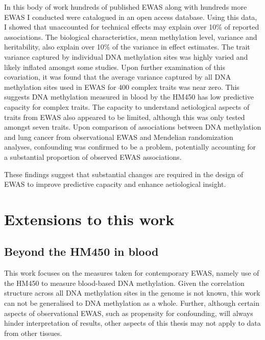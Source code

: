 \documentclass[11pt,oneside]{bristolthesis}
\begin{document}
In this body of work hundreds of published EWAS along with hundreds more EWAS I conducted were catalogued in an open access database. Using this data, I showed that unaccounted for technical effects may explain over 10\% of reported associations. The biological characteristics, mean methylation level, variance and heritability, also explain over 10\% of the variance in effect estimates. The trait variance captured by individual DNA methylation sites was highly varied and likely inflated amongst some studies. Upon further examination of this covariation, it was found that the average variance captured by all DNA methylation sites used in EWAS for 400 complex traits was near zero. This suggests DNA methylation measured in blood by the HM450 has low predictive capacity for complex traits. The capacity to understand aetiological aspects of traits from EWAS also appeared to be limited, although this was only tested amongst seven traits. Upon comparison of associations between DNA methylation and lung cancer from observational EWAS and Mendelian randomization analyses, confounding was confirmed to be a problem, potentially accounting for a substantial proportion of observed EWAS associations.

These findings suggest that substantial changes are required in the design of EWAS to improve predictive capacity and enhance aetiological insight.

\hypertarget{extensions-to-work}{%
\section{Extensions to this work}\label{extensions-to-work}}

\hypertarget{beyond-the-hm450}{%
\subsection{Beyond the HM450 in blood}\label{beyond-the-hm450}}

This work focuses on the measures taken for contemporary EWAS, namely use of the HM450 to measure blood-based DNA methylation. Given the correlation structure across all DNA methylation sites in the genome is not known, this work can not be generalised to DNA methylation as a whole. Further, although certain aspects of observational EWAS, such as propensity for confounding, will always hinder interpretation of results, other aspects of this thesis may not apply to data from other tissues.
\end{document}
